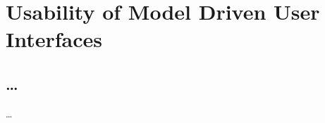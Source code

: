 \chapter{Usability of Model Driven User Interfaces}
\label{ch:Chapter5}

\section{\ldots}
\label{ch:Chapter5:sec:Section1}

\dots
